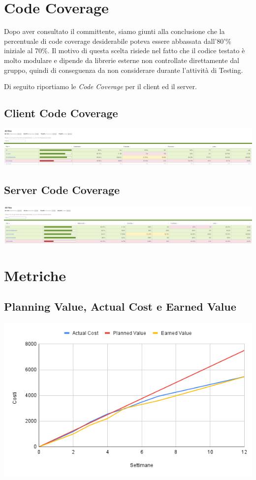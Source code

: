\documentclass[a4paper, 12pt]{article}
\begin{document}
\section{Code Coverage}
Dopo aver consultato il committente, siamo giunti alla conclusione che la 
percentuale di code coverage desiderabile poteva essere abbassata dall'80'\% 
iniziale al 70\%. Il motivo di questa scelta risiede nel fatto che il codice 
testato è molto modulare e dipende da librerie esterne non controllate 
direttamente dal gruppo, quindi di conseguenza da non considerare durante l'attività di Testing.

Di seguito riportiamo le \textit{Code Coverage} per il client ed il server.

\subsection*{Client Code Coverage}
\begin{center}
	\includegraphics[scale=0.20]{client-coverage.png}
\end{center}
\subsection*{Server Code Coverage}
\begin{center}
	\includegraphics[scale=0.20]{server-coverage.png}
\end{center}

\section{Metriche}
\subsection*{Planning Value, Actual Cost e Earned Value}
\begin{center}
	\includegraphics[scale=0.5]{AC_PV_EV.png}
\end{center}
\end{document}
